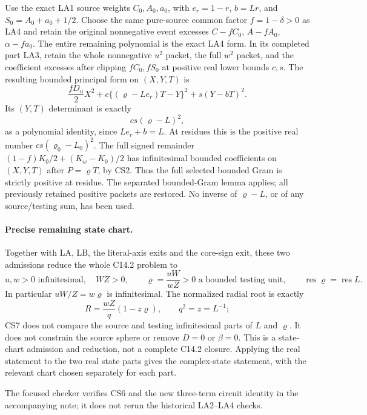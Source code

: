 Use the exact LA1 source weights $C_0,A_0,a_0$, with
$e_r=1-r$, $b=Lr$, and $S_0=A_0+a_0+1/2$.  Choose the same
pure-source common factor $f=1-\delta>0$ as LA4 and retain the
original nonnegative event excesses $C-fC_0$, $A-fA_0$,
$\alpha-fa_0$.  The entire remaining polynomial is the exact LA4
form.  In its completed part LA3, retain the whole nonnegative
$u^2$ packet, the full $w^2$ packet, and the coefficient excesses
after clipping $fC_0,fS_0$ at positive real lower bounds $c,s$.
The resulting bounded principal form on $(X,Y,T)$ is
\[
 \frac{fD_u}{2}X^2
   +c\{(\varrho-Le_r)T-Y\}^2+s(Y-bT)^2.         \tag{CS5}
\]
Its $(Y,T)$ determinant is exactly
\[
 cs(\varrho-L)^2,                               \tag{CS6}
\]
as a polynomial identity, since $Le_r+b=L$.  At residues this is
the positive real number $cs(\varrho_0-L_0)^2$.
The full signed remainder
$(1-f)K_0/2+(K_w-K_0)/2$ has infinitesimal bounded coefficients
on $(X,Y,T)$ after $P=\varrho T$, by CS2.  Thus the full selected
bounded Gram is strictly positive at residue.  The separated
bounded-Gram lemma applies; all previously retained positive
packets are restored.  No inverse of $\varrho-L$, or of any
source/testing sum, has been used.

\paragraph{Precise remaining state chart.}
Together with LA, LB, the literal-axis exits and the core-sign exit,
these two admissions reduce the whole C14.2 problem to
\[
 u,w>0\text{ infinitesimal},\quad WZ>0,\qquad
 \varrho=\frac{uW}{wZ}>0\text{ a bounded testing unit},\qquad
 \operatorname{res}\varrho=\operatorname{res}L.    \tag{CS7}
\]
In particular $uW/Z=w\varrho$ is infinitesimal.  The normalized
radial root is exactly
\[
 R=\frac{wZ}{q}(1-z\varrho),\qquad q^2=z=L^{-1};  \tag{CS8}
\]
CS7 does not compare the source and testing infinitesimal parts of
$L$ and $\varrho$.  It does not constrain the source sphere or
remove $D=0$ or $\beta=0$.  This is a state-chart admission and
reduction, not a complete C14.2 closure.  Applying the real statement
to the two real state parts gives the complex-state statement,
with the relevant chart chosen separately for each part.

The focused checker verifies CS6 and the new three-term circuit
identity in the accompanying note; it does not rerun the historical
LA2--LA4 checks.
